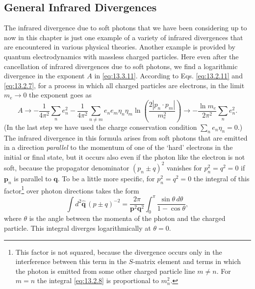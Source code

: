 
\subsection{General Infrared Divergences}

The infrared divergence due to soft photons that we have been considering up
to now in this chapter is just one example of a variety of infrared divergences
that are encountered in various physical theories. Another example is
provided by quantum electrodynamics with massless charged particles. Here even
after the cancellation of infrared divergences due to soft photons, we find a
logarithmic divergence in the exponent $A$ in \eqref{eq:13.3.11}.
According to Eqs. \eqref{eq:13.2.11} and
\eqref{eq:13.2.7}, for a process in which all charged particles are
electrons, in the limit $m_e\to0$ the exponent goes as
\[
A\to-\frac{1}{4\pi^2}\sum_n e_n^2
-\frac{1}{4\pi^2}\sum_{n\ne m}e_ne_m\eta_n\eta_m
\ln\left(\frac{2|p_n\cdot p_m|}{m_e^2}\right)
\to-\frac{\ln m_e}{2\pi^2}\sum_n e_n^2.
\]
(In the last step we have used the charge conservation condition
$\sum_ne_n\eta_n=0$.) The infrared divergence in this formula arises from
soft photons that are emitted in a direction \emph{parallel} to the momentum
of one of the `hard' electrons in the initial or final state, but it occurs
also even if the photon like the electron is not soft, because the propagator
denominator $(p_n\pm q)^2$ vanishes for $p_n^2=q^2=0$ if $\mathbf p_n$ is
parallel to $\mathbf q$. To be a little more specific, for $p_n^2=q^2=0$ the
integral of this factor\footnote{This factor is not squared, because the
divergence occurs only in the interference between this term in the $S$-matrix
element and terms in which the photon is emitted from some other charged
particle line $m\ne n$. For $m=n$ the integral \eqref{eq:13.2.8} is
proportional to $m_n^2$.} over photon directions takes the form
\[
\int d^2\hat{\mathbf q}\,(p\pm q)^{-2}
=\frac{2\pi}{\mathbf p^2\mathbf q^2}\int_0^\pi
\frac{\sin\theta\,d\theta}{1-\cos\theta},
\]
where $\theta$ is the angle between the momenta of the photon and the charged
particle. This integral diverges logarithmically at $\theta=0$.

